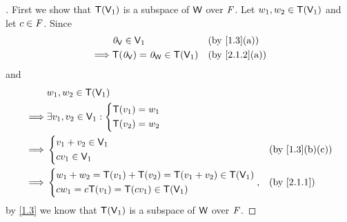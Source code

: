 \begin{proof}[]
  First we show that \(\mathsf{T}(\mathsf{V}_1)\) is a subspace of \(\mathsf{W}\) over \(\mathit{F}\).
  Let \(w_1, w_2 \in \mathsf{T}(\mathsf{V}_1)\) and let \(c \in \mathit{F}\).
  Since
  \begin{align*}
             & \zv_{\V} \in \V_1                    &  & \text{(by \cref{1.3}(a))}   \\
    \implies & \T(\zv_{\V}) = \zv_{\W} \in \T(\V_1) &  & \text{(by \cref{2.1.2}(a))}
  \end{align*}
  and
  \begin{align*}
             & w_1, w_2 \in \T(\V_1)                                                                    \\
    \implies & \exists v_1, v_2 \in \V_1 : \begin{dcases}
      \T(v_1) = w_1 \\
      \T(v_2) = w_2
    \end{dcases}                                   \\
    \implies & \begin{dcases}
      v_1 + v_2 \in \V_1 \\
      c v_1 \in \V_1
    \end{dcases}                             &  & \text{(by \cref{1.3}(b)(c))} \\
    \implies & \begin{dcases}
      w_1 + w_2 = \T(v_1) + \T(v_2) = \T(v_1 + v_2) \in \T(\V_1) \\
      c w_1 = c \T(v_1) = \T(c v_1) \in \T(\V_1)
    \end{dcases},                            &  & \text{(by \cref{2.1.1})}
  \end{align*}
  by \cref{1.3} we know that \(\mathsf{T}(\mathsf{V}_1)\) is a subspace of \(\mathsf{W}\) over \(\mathit{F}\).


\end{proof}
